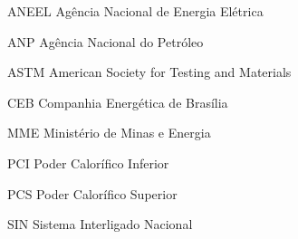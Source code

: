 \begin{siglas}
  \item[ANEEL] Agência Nacional de Energia Elétrica
  \item[ANP]   Agência Nacional do Petróleo
  \item[ASTM]  American Society for Testing and Materials
  \item[CEB]   Companhia Energética de Brasília
  \item[MME]   Ministério de Minas e Energia
  \item[PCI]   Poder Calorífico Inferior
  \item[PCS]   Poder Calorífico Superior
  \item[SIN]   Sistema Interligado Nacional
  
  
 
\end{siglas}
